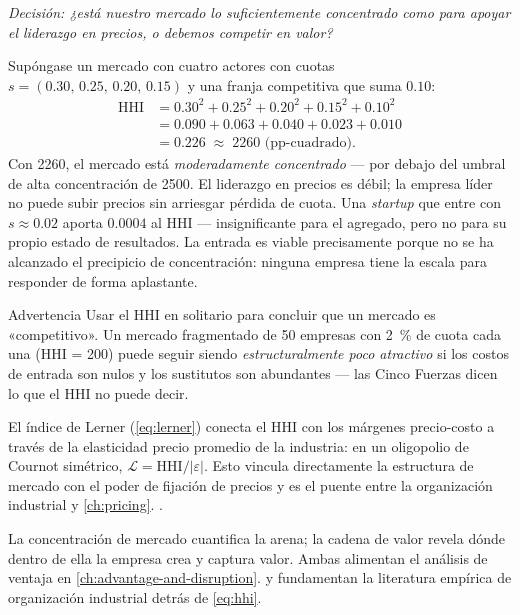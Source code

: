 \begin{example}
\emph{Decisión: ¿está nuestro mercado lo suficientemente concentrado como para apoyar el
liderazgo en precios, o debemos competir en valor?}

Supóngase un mercado con cuatro actores con cuotas
\(s = (0.30,\,0.25,\,0.20,\,0.15)\) y una franja competitiva que suma \(0.10\):
\[
  \begin{aligned}
    \mathrm{HHI} &= 0.30^2 + 0.25^2 + 0.20^2 + 0.15^2 + 0.10^2 \\
                 &= 0.090 + 0.063 + 0.040 + 0.023 + 0.010 \\
                 &= 0.226 \;\approx\; \num{2260}\text{ (pp-cuadrado)}.
  \end{aligned}
\]
Con \num{2260}, el mercado está \emph{moderadamente concentrado} --- por debajo del umbral de
alta concentración de \num{2500}. El liderazgo en precios es débil; la empresa líder no puede
subir precios sin arriesgar pérdida de cuota. Una \emph{startup} que entre con
\(s \approx 0.02\) aporta \(0.0004\) al HHI --- insignificante para el agregado, pero no
para su propio estado de resultados. La entrada es viable precisamente porque no se ha
alcanzado el precipicio de concentración: ninguna empresa tiene la escala para responder de
forma aplastante.
\end{example}

\begin{admonition}{Advertencia}
Usar el HHI en solitario para concluir que un mercado es «competitivo». Un mercado
fragmentado de 50 empresas con \qty{2}{\percent} de cuota cada una (HHI = \num{200}) puede
seguir siendo \emph{estructuralmente poco atractivo} si los costos de entrada son nulos y los
sustitutos son abundantes --- las Cinco Fuerzas dicen lo que el HHI no puede decir.
\end{admonition}

El índice de Lerner (\cref{eq:lerner}) conecta el HHI con los márgenes precio-costo a través
de la elasticidad precio promedio de la industria: en un oligopolio de Cournot simétrico,
\(\mathcal{L} = \mathrm{HHI}/|\varepsilon|\). Esto vincula directamente la estructura de
mercado con el poder de fijación de precios y es el puente entre la organización industrial
y \cref{ch:pricing}. \parencite{mankiw2020,dranove7theconomics}.

La concentración de mercado cuantifica la arena; la cadena de valor revela dónde dentro de
ella la empresa crea y captura valor. Ambas alimentan el análisis de ventaja en
\cref{ch:advantage-and-disruption}. \textcite{mankiw2020} y \textcite{dranove7theconomics}
fundamentan la literatura empírica de organización industrial detrás de \cref{eq:hhi}.

